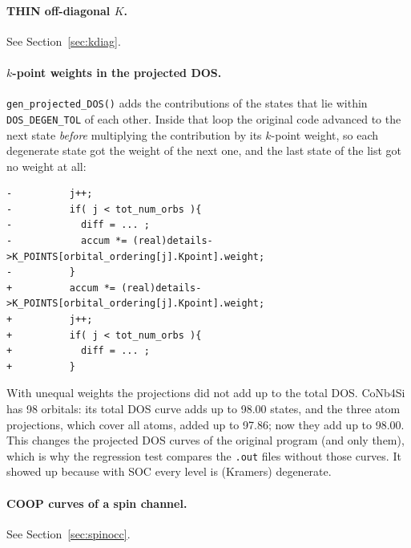 \documentclass[11pt,a4paper]{article}
\newcommand{\fn}[1]{\texttt{#1()}}
\newcommand{\var}[1]{\texttt{#1}}
\begin{document}
\paragraph{THIN off-diagonal $K$.} See Section~\ref{sec:kdiag}.

\paragraph{$k$-point weights in the projected DOS.} \fn{gen\_projected\_DOS} adds the
contributions of the states that lie within \var{DOS\_DEGEN\_TOL} of each other. Inside
that loop the original code advanced to the next state \emph{before} multiplying the
contribution by its $k$-point weight, so each degenerate state got the weight of the next
one, and the last state of the list got no weight at all:
\begin{lstlisting}[style=diff]
-          j++;
-          if( j < tot_num_orbs ){
-            diff = ... ;
-            accum *= (real)details->K_POINTS[orbital_ordering[j].Kpoint].weight;
-          }
+          accum *= (real)details->K_POINTS[orbital_ordering[j].Kpoint].weight;
+          j++;
+          if( j < tot_num_orbs ){
+            diff = ... ;
+          }
\end{lstlisting}
With unequal weights the projections did not add up to the total DOS. CoNb4Si has 98
orbitals: its total DOS curve adds up to 98.00 states, and the three atom projections,
which cover all atoms, added up to 97.86; now they add up to 98.00.
This changes the projected DOS curves of the original program (and only them), which
is why the regression test compares the \texttt{.out} files without those curves. It
showed up because with SOC every level is (Kramers) degenerate.

\paragraph{COOP curves of a spin channel.} See Section~\ref{sec:spinocc}.
\end{document}
